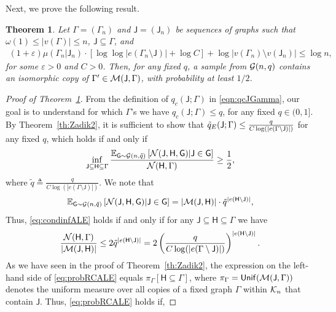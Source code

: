 \documentclass[12pt]{article}
\newtheorem{theorem}{Theorem}
\newcommand{\E}{\mathbb{E}}
\newcommand{\calG}{{\cal G}}
\newcommand{\calK}{{\cal K}}
\newcommand{\calM}{{\cal M}}
\newcommand{\calN}{{\cal N}}
\newcommand{\p}[1]{\left(#1\right)}
\newcommand{\pp}[1]{\left[#1\right]}
\newcommand{\s}[1]{\mathsf{#1}}
\begin{document}
Next, we prove the following result.
\begin{theorem}
\label{theorem:sublogProbALE}
Let $\Gamma=(\Gamma_n)$ and $\s{J} = (\s{J}_n)$ be sequences of graphs such that $\omega(1) \leq |v(\Gamma)|\leq n$, $\s{J}\subseteq\Gamma$, and
\begin{align}
  (1+\varepsilon)\mu(\Gamma_n\vert\s{J}_n)\cdot [\log\log|e(\Gamma_n\setminus\s{J})|+\log C]+\log|v(\Gamma_n)\setminus v(\s{J}_n)|\leq \log n,\label{eq:condCopyALE}
\end{align}
for some $\varepsilon>0$ and $C>0$. Then, for any fixed $q$, a sample from $\calG(n,q)$ contains an isomorphic copy of $\Gamma'\in\calM(\s{J},\Gamma)$, with probability at least $1/2$.
\end{theorem}
\begin{proof}[Proof of Theorem~\ref{theorem:sublogProbALE}]
    From the definition of $q_{c}(\s{J};\Gamma)$ in \eqref{eqn:qcJGamma}, our goal is to understand for which $\Gamma$'s we have $q_{c}(\s{J};\Gamma)\leq q$, for any fixed $q\in (0,1]$. By Theorem~\ref{th:Zadik2}, it is sufficient to show that $ \Tilde{q}_E(\s{J};\Gamma)\leq \frac{q}{C\log(|e(\Gamma\setminus\s{J})|)}$ for any fixed $q$, which holds if and only if
    \begin{align}
        \inf_{\s{J}\subseteq\s{H}\subseteq \Gamma} \frac{\E_{\s{G}\sim\calG(n,\tilde{q})}\pp{\calN(\s{J},\s{H},\s{G})\vert\s{J}\in\s{G}}}{\calN(\s{H},\Gamma)}\geq \frac{1}{2},\label{eq:condinfALE}
    \end{align}
    where $\tilde{q}\triangleq\frac{q}{C\log(|e(\Gamma\setminus\s{J})|)}$. We note that
    \begin{align}
    \E_{\s{G}\sim\calG(n,\tilde{q})}\pp{\calN(\s{J},\s{H},\s{G})\vert\s{J}\in\s{G}}=|\calM(\s{J},\s{H})|\cdot \tilde{q}^{|e(\s{H}\setminus\s{J})|},
    \end{align}
    Thus, \eqref{eq:condinfALE} holds if and only if for any $\s{J}\subseteq\s{H}\subseteq \Gamma$ we have
    \begin{align}
        \frac{\calN(\s{H},\Gamma)}{|\calM(\s{J},\s{H})|}\leq 2 \tilde{q}^{|e(\s{H}\setminus\s{J})|}=2\p{\frac{q}{C\log(|e(\Gamma\setminus\s{J})|)}}^{|e(\s{H}\setminus\s{J})|}.\label{eq:probRCALE}
    \end{align}
    As we have seen in the proof of Theorem~\ref{th:Zadik2}, the expression on the left-hand side of \eqref{eq:probRCALE} equals $\pi_{\Gamma}[\s{H}\subseteq \Gamma]$, where $\pi_\Gamma=\s{Unif}(\calM(\s{J},\Gamma))$ denotes the uniform measure over all copies of a fixed graph $\Gamma$ within $\calK_n$ that contain $\s{J}$. Thus, \eqref{eq:probRCALE} holds if,

\end{proof}
\end{document}
